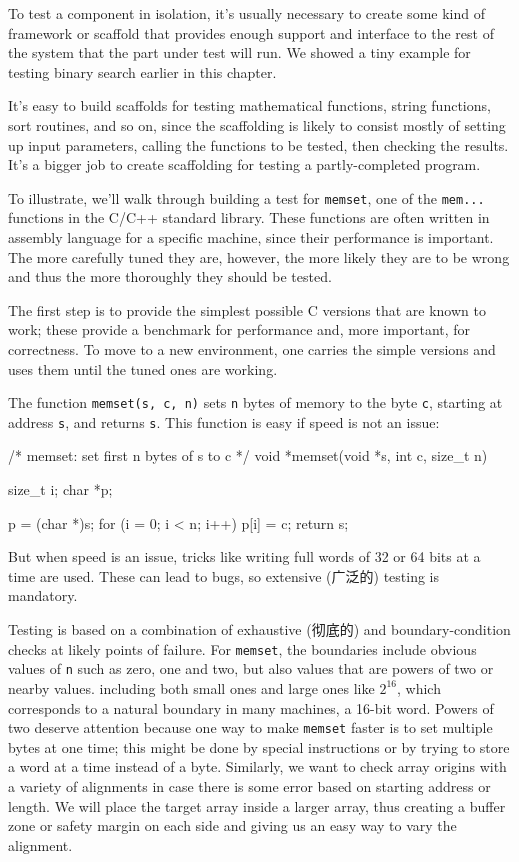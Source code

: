 To test a component in isolation, it's usually necessary to create some
kind of framework or scaffold that provides enough support and interface to
the rest of the system that the part under test will run. We showed a tiny
example for testing binary search earlier in this chapter.

It's easy to build scaffolds for testing mathematical functions, string
functions, sort routines, and so on, since the scaffolding is likely to
consist mostly of setting up input parameters, calling the functions to be
tested, then checking the results. It's a bigger job to create scaffolding
for testing a partly-completed program.

To illustrate, we'll walk through building a test for \texttt{memset}, one
of the \verb'mem...' functions in the C/C++ standard library. These
functions are often written in assembly language for a specific machine,
since their performance is important.  The more carefully tuned they are,
however, the more likely they are to be wrong and thus the more thoroughly
they should be tested.

The first step is to provide the simplest possible C versions that are
known to work; these provide a benchmark for performance and, more
important, for correctness. To move to a new environment, one carries the
simple versions and uses them until the tuned ones are working.

The function \verb'memset(s, c, n)' sets \verb'n' bytes of memory to the
byte \verb'c', starting at address \verb's', and returns \verb's'. This
function is easy if speed is not an issue:
\begin{wellcode}
    /* memset: set first n bytes of s to c */
    void *memset(void *s, int c, size_t n)
    {
        size_t  i;
        char    *p;

        p = (char *)s;
        for (i = 0; i < n; i++)
            p[i] = c;
        return s;
    }
\end{wellcode}
But when speed is an issue, tricks like writing full words of 32 or 64 bits
at a time are used. These can lead to bugs, so extensive (广泛的) testing
is mandatory.

Testing is based on a combination of exhaustive (彻底的) and
boundary-condition checks at likely points of failure. For \texttt{memset},
the boundaries include obvious values of \texttt{n} such as zero, one and
two, but also values that are powers of two or nearby values. including
both small ones and large ones like $2^16$, which corresponds to a natural
boundary in many machines, a 16-bit word. Powers of two deserve attention
because one way to make \texttt{memset} faster is to set multiple bytes at
one time; this might be done by special instructions or by trying to store
a word at a time instead of a byte.  Similarly, we want to check array
origins with a variety of alignments in case there is some error based on
starting address or length. We will place the target array inside a larger
array, thus creating a buffer zone or safety margin on each side and giving
us an easy way to vary the alignment.

